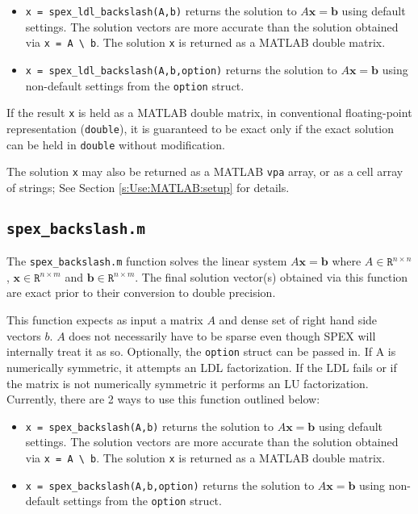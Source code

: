 \documentclass[12pt,oneside]{book}
\theoremstyle{definition}
\renewcommand{\b}{\mathbf{b}}
\newcommand{\x}{\mathbf{x}}
\begin{document}
\begin{itemize}

\item \verb|x = spex_ldl_backslash(A,b)| returns the solution to $A \x =
\b$ using default settings. The solution vectors are more accurate than
the solution obtained via \verb|x = A \ b|.  The solution \verb|x| is
returned as a MATLAB double matrix.

\item \verb|x = spex_ldl_backslash(A,b,option)| returns the solution to $A \x =
\b$ using non-default settings from the \verb|option| struct.

\end{itemize}

If the result \verb|x| is held as a MATLAB double matrix, in conventional
floating-point representation (\verb|double|), it is guaranteed to be exact
only if the exact solution can be held in \verb|double| without modification.

The solution \verb|x| may also be returned as a MATLAB \verb|vpa| array, or as
a cell array of strings; See Section \ref{s:Use:MATLAB:setup} for details.

\subsection{\texttt{spex\_backslash.m}}
The \verb|spex_backslash.m| function solves the linear system $A \x = \b$ where
$A \in \mathtt{R}^{n \times n}$, $\x \in \mathtt{R}^{n \times m}$ and $\b \in
\mathtt{R}^{n \times m}$. The final solution vector(s) obtained via this
function are exact prior to their conversion to double precision.

This function expects as input a matrix $A$ and dense set of
right hand side vectors $b$. $A$ does not necessarily have to be sparse
even though SPEX will internally treat it as so.
Optionally, the \verb|option| struct can be passed in.
If A is numerically symmetric, it attempts an LDL factorization. If the LDL
fails or if the matrix is not numerically symmetric it performs an LU factorization.
Currently, there are 2 ways to use this function outlined below:

\begin{itemize}

\item \verb|x = spex_backslash(A,b)| returns the solution to $A \x =
\b$ using default settings. The solution vectors are more accurate than
the solution obtained via \verb|x = A \ b|.  The solution \verb|x| is
returned as a MATLAB double matrix.

\item \verb|x = spex_backslash(A,b,option)| returns the solution to $A \x =
\b$ using non-default settings from the \verb|option| struct.

\end{itemize}
\end{document}
